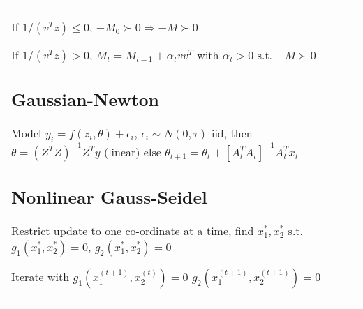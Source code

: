 \begin{tabulary}{\textwidth}{l L}
If $1/(v^Tz) \leq 0$, $-M_0 \succ 0 \Rightarrow -M \succ 0$

If $1/(v^Tz) > 0$, $M_t = M_{t-1} + \alpha_t vv^T$ with $\alpha_t > 0$ s.t. $-M \succ 0$

\subsection{Gaussian-Newton}

Model $y_i = f(z_i, \theta) + \epsilon_i$, $\epsilon_i \sim N(0, \tau)$ iid, then 
$\theta = (Z^TZ)^{-1}Z^T y$ (linear) else
$\theta_{t+1} = \theta_t + [A_t^T A_t]^{-1}A_t^T x_t$

\subsection{Nonlinear Gauss-Seidel}

Restrict update to one co-ordinate at a time,
find $x_1^*, x_2^*$ s.t. $g_1(x_1^*, x_2^*) = 0$, $g_2(x_1^*, x_2^*) = 0$

Iterate with $g_1(x_1^{(t+1)}, x_2^{(t)}) = 0$
$g_2(x_1^{(t+1)}, x_2^{(t+1)}) = 0$

\end{tabulary}